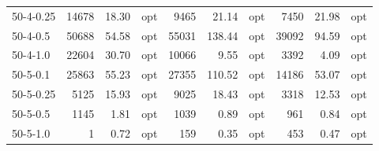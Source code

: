 \documentclass[11pt]{article}
\begin{document}
\begin{table}[]
\begin{tabular}{lrrlrrlrrl}
50-4-0.25 & 14678    & 18.30    & opt   & 9465  & 21.14  & opt                        & 7450     & 21.98    & opt   \\
50-4-0.5  & 50688    & 54.58    & opt   & 55031 & 138.44 & opt                        & 39092    & 94.59    & opt   \\
50-4-1.0  & 22604    & 30.70    & opt   & 10066 & 9.55   & opt                        & 3392     & 4.09     & opt   \\
50-5-0.1  & 25863    & 55.23    & opt   & 27355 & 110.52 & opt                        & 14186    & 53.07    & opt   \\
50-5-0.25 & 5125     & 15.93    & opt   & 9025  & 18.43  & opt                        & 3318     & 12.53    & opt   \\
50-5-0.5  & 1145     & 1.81     & opt   & 1039  & 0.89   & opt                        & 961      & 0.84     & opt   \\
50-5-1.0  & 1        & 0.72     & opt   & 159   & 0.35   & opt                        & 453      & 0.47     & opt
\end{tabular}
\end{table}
\end{document}
